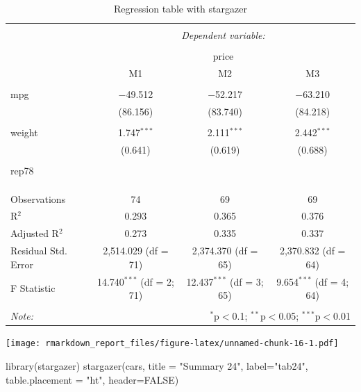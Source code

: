 \documentclass[
  12pt,
]{article}
\newenvironment{Shaded}{\begin{snugshade}}{\end{snugshade}}
\newcommand{\AttributeTok}[1]{\textcolor[rgb]{0.77,0.63,0.00}{#1}}
\newcommand{\ConstantTok}[1]{\textcolor[rgb]{0.00,0.00,0.00}{#1}}
\newcommand{\FunctionTok}[1]{\textcolor[rgb]{0.00,0.00,0.00}{#1}}
\newcommand{\NormalTok}[1]{#1}
\newcommand{\StringTok}[1]{\textcolor[rgb]{0.31,0.60,0.02}{#1}}
\begin{document}
\begin{table}[ht] \centering 
  \caption{Regression table with stargazer} 
  \label{tab3} 
\begin{tabular}{@{\extracolsep{5pt}}lccc} 
\\[-1.8ex]\hline 
\hline \\[-1.8ex] 
 & \multicolumn{3}{c}{\textit{Dependent variable:}} \\ 
\cline{2-4} 
\\[-1.8ex] & \multicolumn{3}{c}{price} \\ 
 & M1 & M2 & M3 \\ 
\hline \\[-1.8ex] 
 mpg & $-$49.512 & $-$52.217 & $-$63.210 \\ 
  & (86.156) & (83.740) & (84.218) \\ 
  & & & \\ 
 weight & 1.747$^{***}$ & 2.111$^{***}$ & 2.442$^{***}$ \\ 
  & (0.641) & (0.619) & (0.688) \\ 
  & & & \\ 
 rep78 &  &  &  \\ 
  &  &  &  \\ 
  & & & \\ 
\hline \\[-1.8ex] 
Observations & 74 & 69 & 69 \\ 
R$^{2}$ & 0.293 & 0.365 & 0.376 \\ 
Adjusted R$^{2}$ & 0.273 & 0.335 & 0.337 \\ 
Residual Std. Error & 2,514.029 (df = 71) & 2,374.370 (df = 65) & 2,370.832 (df = 64) \\ 
F Statistic & 14.740$^{***}$ (df = 2; 71) & 12.437$^{***}$ (df = 3; 65) & 9.654$^{***}$ (df = 4; 64) \\ 
\hline 
\hline \\[-1.8ex] 
\textit{Note:}  & \multicolumn{3}{r}{$^{*}$p$<$0.1; $^{**}$p$<$0.05; $^{***}$p$<$0.01} \\ 
\end{tabular} 
\end{table}

\texttt{[image: rmarkdown\_report\_files/figure-latex/unnamed-chunk-16-1.pdf]}

\begin{Shaded}
\begin{Highlighting}[]
\FunctionTok{library}\NormalTok{(stargazer)}
\FunctionTok{stargazer}\NormalTok{(cars,}
          \AttributeTok{title =} \StringTok{"Summary 24"}\NormalTok{,}
          \AttributeTok{label=}\StringTok{"tab24"}\NormalTok{,}
          \AttributeTok{table.placement =} \StringTok{"ht"}\NormalTok{,}
          \AttributeTok{header=}\ConstantTok{FALSE}\NormalTok{)}
\end{Highlighting}
\end{Shaded}
\end{document}
